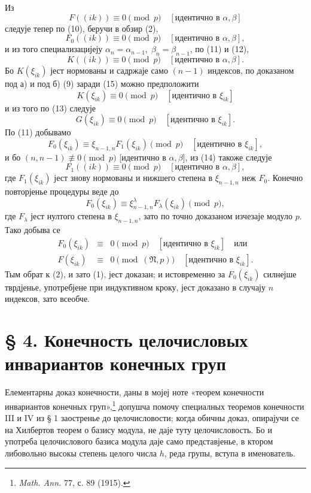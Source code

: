 ﻿\documentclass[11pt]{article}
\providecommand{\frN}{\mathfrak N}
\begin{document}
Из
\[
        F((ik))\equiv0\pmod p\quad [\text{идентично в \(\alpha,\beta\)}]
\]
следује тепер по (10), беручи в обзир (2),
\begin{equation}
        F_0((ik))\equiv0\pmod p\quad [\text{идентично в \(\alpha,\beta\)}],
\end{equation}
и из того специализацијеју \(\alpha_n=\alpha_{n-1},\;\beta_n=\beta_{n-1}\), по (11) и (12),
\begin{equation}
        K((ik))\equiv0\pmod p\quad [\text{идентично в \(\alpha,\beta\)}].
\end{equation}
Бо \(K(\xi_{ik})\) јест нормованы и садржаје само \((n-1)\) индексов, по доказаном под а) и под б) (9) заради (15) можно предположити
\[
        K(\xi_{ik})\equiv0\pmod p\quad [\text{идентично в \(\xi_{ik}\)}]
\]
и из того по (13) следује
\[
        G(\xi_{ik})\equiv0\pmod p\quad [\text{идентично в \(\xi_{ik}\)}].
\]
По (11) добывамо
\[
        F_0(\xi_{ik})\equiv\xi_{n-1,n}F_1(\xi_{ik})\pmod p\quad [\text{идентично в \(\xi_{ik}\)}],
\]
и бо \((n,n-1)\not\equiv0\pmod p\) [идентично в \(\alpha,\beta\)], из (14) такоже следује
\[
        F_1((ik))\equiv0\pmod p\quad [\text{идентично в \(\alpha,\beta\)}],
\]
где \(F_1(\xi_{ik})\) јест знову нормованы и нижшего степена в \(\xi_{n-1,n}\) неж \(F_0\). Конечно повторјенье процедуры веде до
\[
        F_0(\xi_{ik})\equiv\xi_{n-1,n}^{\lambda}F_\lambda(\xi_{ik})\pmod p,
\]
где \(F_\lambda\) јест нултого степена в \(\xi_{n-1,n}\), зато по точно доказаном изчезаје модуло \(p\). Тако добыва се
\begin{equation}
\begin{array}{rcl}
        F_0(\xi_{ik})&\equiv&0\pmod p\quad [\text{идентично в \(\xi_{ik}\)}]\quad \text{или}\\
        F(\xi_{ik})&\equiv&0\pmod{(\frN,p)}\quad [\text{идентично в \(\xi_{ik}\)}].
\end{array}
\end{equation}
Тым обрат к (2), и зато (1), јест доказан; и истовременно за \(F_0(\xi_{ik})\) силнејше тврдјенье, употребјене при индуктивном кроку, јест доказано в случају \(n\) индексов, зато всеобче.

\setcounter{equation}{0}
\section*{§ 4. Конечность целочисловых инвариантов конечных груп}

Елементарны доказ конечности, даны в мојеј ноте «теорем конечности инвариантов конечных груп»,\footnote{\emph{Math. Ann.} 77, с. 89 (1915).} допушча помочу специалных теоремов конечности III и IV из § 1 заостренье до целочисловости; когда обичны доказ, опирајучи се на Хилбертов теорем о базису модула, не даје туту целочисловость. Бо и употреба целочислового базиса модула даје само представјенье, в ктором либовольно высокы степень целого числа \(h\), реда групы, вступа в именователь.
\end{document}
